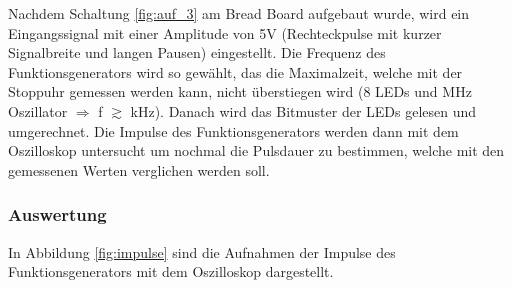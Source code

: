 \documentclass[12pt,a4paper]{article}
\begin{document}
Nachdem Schaltung \ref{fig:auf_3}  am Bread Board aufgebaut wurde, wird ein Eingangssignal mit einer Amplitude von 5V (Rechteckpulse mit kurzer Signalbreite und langen Pausen) eingestellt. Die Frequenz des Funktionsgenerators wird so gewählt, das die Maximalzeit, welche mit der Stoppuhr gemessen werden kann, nicht überstiegen wird (8 LEDs und \unit[1]{MHz} Oszillator $\Rightarrow$ f $\gtrsim$ \unit[4]{kHz}). Danach wird das Bitmuster der LEDs gelesen und umgerechnet. Die Impulse des Funktionsgenerators werden dann mit dem Oszilloskop untersucht um nochmal die Pulsdauer zu bestimmen, welche mit den gemessenen Werten verglichen werden soll.

\subsubsection*{Auswertung}
In Abbildung \ref{fig:impulse} sind die Aufnahmen der Impulse des Funktionsgenerators mit dem Oszilloskop dargestellt.
\end{document}

